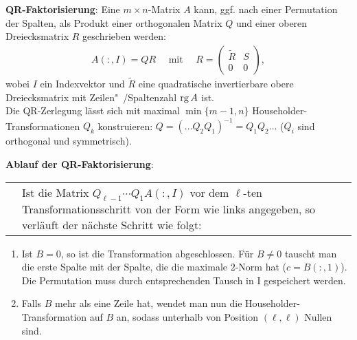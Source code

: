 \linie

\textbf{QR-Faktorisierung}:
Eine $m \times n$-Matrix $A$ kann, ggf. nach einer Permutation der Spalten,
als Produkt einer orthogonalen Matrix $Q$ und einer oberen Dreiecksmatrix
$R$ geschrieben werden:
\begin{align*}
    A(:,I) = QR \quad\text{ mit }\quad
    R = \begin{pmatrix}\widetilde{R} & S \\ 0 & 0\end{pmatrix},
\end{align*}
wobei $I$ ein Indexvektor und $\widetilde{R}$ eine quadratische invertierbare
obere Dreiecksmatrix mit Zei\-len"~/Spaltenzahl $\operatorname{rg} A$ ist. \\
Die QR-Zerlegung lässt sich mit maximal $\min\{m - 1, n\}$
Householder-Transformationen $Q_k$ konstruieren:
$Q = (\dotsc Q_2 Q_1)^{-1} = Q_1 Q_2 \dotsc$
($Q_i$ sind orthogonal und symmetrisch).

\textbf{Ablauf der QR-Faktorisierung}: \\
\begin{tabular}{p{4.5cm}p{11.65cm}}
\matrixsize{$\left(\begin{array}{ccc|ccc}
\ast & \cdots & \ast & \ast & \cdots & \ast \\
& \ddots & \vdots & \vdots & & \vdots \\
0 & & \ast & \ast & \cdots & \ast \\ \hline
& & & & & \\
& 0 & & & B & \\
& & & & & \\
\end{array}\right)$}
&
\begin{minipage}[c]{11.65cm}
Ist die Matrix $Q_{\ell - 1} \dotsm Q_1 A(:,I)$ vor dem $\ell$-ten
Transformationsschritt von der Form wie links angegeben, so verläuft der
nächste Schritt wie folgt:
\end{minipage}\end{tabular}
\begin{enumerate}
    \item Ist $B = 0$, so ist die Transformation abgeschlossen.
    Für $B \not= 0$ tauscht man die erste Spalte mit der Spalte, die
    die maximale $2$-Norm hat ($c = B(:,1)$).
    Die Permutation muss durch entsprechenden Tausch in I gespeichert werden.

    \item Falls $B$ mehr als eine Zeile hat, wendet man nun die
    Householder-Transformation auf $B$ an, sodass unterhalb von Position
    $(\ell, \ell)$ Nullen sind.
\end{enumerate}


